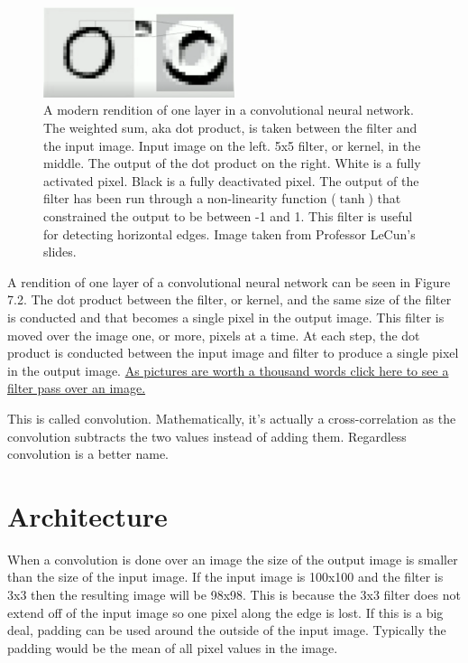 \begin{figure}[ht]
  \centering    
      \includegraphics[width=0.5\textwidth]{figs/ConvnetArch.png}
          \caption{
            A modern rendition of one layer in a convolutional neural network.
            The weighted sum, aka dot product, is taken between the filter and the input image.
            Input image on the left.
            5x5 filter, or kernel, in the middle.
            The output of the dot product on the right.
            White is a fully activated pixel.
            Black is a fully deactivated pixel.
            The output of the filter has been run through a non-linearity function ($\tanh$) that constrained the output to be between -1 and 1.
            This filter is useful for detecting horizontal edges.
            Image taken from Professor LeCun's slides.
          }
\end{figure}

A rendition of one layer of a convolutional neural network can be seen in Figure 7.2. The dot product between the filter, or kernel, and the same size of the filter is conducted and that becomes a single pixel in the output image. This filter is moved over the image one, or more, pixels at a time. At each step, the dot product is conducted between the input image and filter to produce a single pixel in the output image.
\href{https://cdn-images 1.medium.com/max/1600/1*ZCjPUFrB6eHPRi4eyP6aaA.gif}{As pictures are worth a thousand words click here to see a filter pass over an image.}

This is called convolution. Mathematically, it's actually a cross-correlation as the convolution subtracts the two values instead of adding them. Regardless convolution is a better name.

\section{Architecture}

When a convolution is done over an image the size of the output image is smaller than the size of the input image. If the input image is 100x100 and the filter is 3x3 then the resulting image will be 98x98. This is because the 3x3 filter does not extend off of the input image so one pixel along the edge is lost. If this is a big deal, padding can be used around the outside of the input image. Typically the padding would be the mean of all pixel values in the image.

